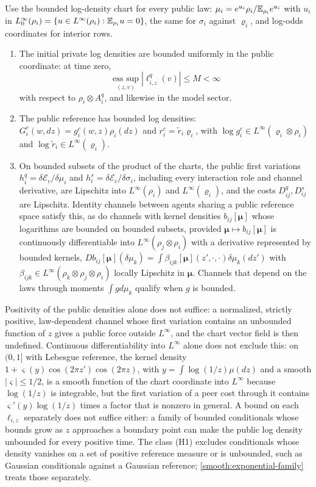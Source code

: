 Use the bounded log-density chart for every public law: $\mu_i=e^{u_i}\rho_i/\mathbb E_{\rho_i}e^{u_i}$ with $u_i$ in $L^\infty_0(\rho_i)=\{u\in L^\infty(\rho_i):\mathbb E_{\rho_i}u=0\}$, the same for $\sigma_i$ against $\varrho_i$, and log-odds coordinates for interior rows.
\begin{enumerate}
\item[(H1)] The initial private log densities are bounded uniformly in the public coordinate: at time zero,
\begin{equation}
 \operatorname*{ess\ sup}_{(z,v)}|\ell^q_{i,z}(v)|\leq M<\infty
 \label{smooth:h1-bound}
\end{equation}
with respect to $\rho_i\otimes A_i^q$, and likewise in the model sector.
\item[(H2)] The public reference has bounded log densities: $G_i^c(w,dz)=g_i^c(w,z)\rho_i(dz)$ and $r_i^c=\tilde r_i\varrho_i$, with $\log g_i^c\in L^\infty(\varrho_i\otimes\rho_i)$ and $\log\tilde r_i\in L^\infty(\varrho_i)$.
\item[(H3)] On bounded subsets of the product of the charts, the public first variations $h_i^q=\delta\mathcal E_c/\delta\mu_i$ and $h_i^s=\delta\mathcal E_c/\delta\sigma_i$, including every interaction role and channel derivative, are Lipschitz into $L^\infty(\rho_i)$ and $L^\infty(\varrho_i)$, and the costs $D_{ij}^q,D_{ij}^s$ are Lipschitz. Identity channels between agents sharing a public reference space satisfy this, as do channels with kernel densities $b_{ij}[\boldsymbol\mu]$ whose logarithms are bounded on bounded subsets, provided $\boldsymbol\mu\mapsto b_{ij}[\boldsymbol\mu]$ is continuously differentiable into $L^\infty(\rho_j\otimes\rho_i)$ with a derivative represented by bounded kernels, $Db_{ij}[\boldsymbol\mu](\delta\mu_k)=\int\beta_{ijk}[\boldsymbol\mu](z',\cdot,\cdot)\delta\mu_k(dz')$ with $\beta_{ijk}\in L^\infty(\rho_k\otimes\rho_j\otimes\rho_i)$ locally Lipschitz in $\boldsymbol\mu$. Channels that depend on the laws through moments $\int g d\mu_k$ qualify when $g$ is bounded.
\end{enumerate}
Positivity of the public densities alone does not suffice: a normalized, strictly positive, law-dependent channel whose first variation contains an unbounded function of $z$ gives a public force outside $L^\infty$, and the chart vector field is then undefined. Continuous differentiability into $L^\infty$ alone does not exclude this: on $(0,1]$ with Lebesgue reference, the kernel density $1+\varsigma(y)\cos(2\pi z')\cos(2\pi z)$, with $y=\int\log(1/z)\mu(dz)$ and a smooth $|\varsigma|\leq1/2$, is a smooth function of the chart coordinate into $L^\infty$ because $\log(1/z)$ is integrable, but the first variation of a peer cost through it contains $\varsigma'(y)\log(1/z)$ times a factor that is nonzero in general. A bound on each $\ell_{i,z}$ separately does not suffice either: a family of bounded conditionals whose bounds grow as $z$ approaches a boundary point can make the public log density unbounded for every positive time. The class (H1) excludes conditionals whose density vanishes on a set of positive reference measure or is unbounded, such as Gaussian conditionals against a Gaussian reference; \cref{smooth:exponential-family} treats those separately.

